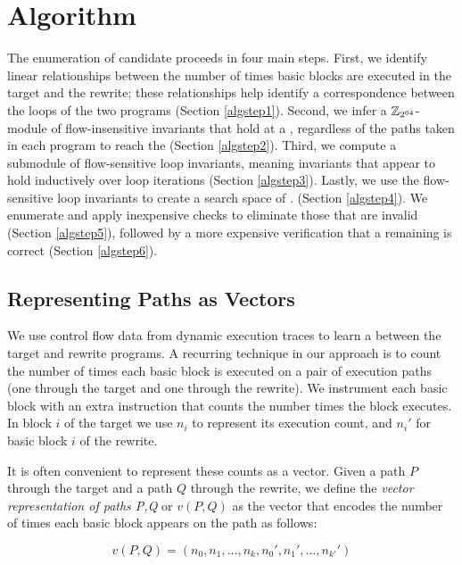 \section{Algorithm}\label{sec:algorithm}


The enumeration of candidate \bisimreps{} proceeds in four main steps.
First, we identify linear relationships between the number of times
basic blocks are executed in the target and the rewrite; these
relationships help identify a correspondence between the loops
of the two programs (Section \ref{algstep1}). Second, we infer
a $\mathbb{Z}_{2^{64}}$-module of flow-insensitive invariants that hold at a
\cutpoint, regardless of the paths taken in each program to reach the
\cutpoint{} (Section \ref{algstep2}). Third, we compute a submodule
of flow-sensitive loop invariants, meaning invariants that appear
to hold inductively over loop iterations (Section \ref{algstep3}).
Lastly, we use the flow-sensitive loop invariants to create a search
space of \bisimreps. (Section \ref{algstep4}). We enumerate \bisimreps and
apply inexpensive checks to eliminate those that are invalid (Section
\ref{algstep5}), followed by a more expensive verification that a
remaining \bisimrep{} is correct (Section \ref{algstep6}).

\subsection{Representing Paths as Vectors}

We use control flow data from dynamic execution traces to learn
a \bisim{} between the target and rewrite programs. A recurring
technique in our approach is to count the number of times each basic
block is executed on a pair of execution paths (one through the target
and one through the rewrite). We instrument each basic block with an
extra instruction that counts the number times the block executes.
In block $i$ of the target we use \shadow{} $n_i$ to represent its
execution count, and $n_i'$ for basic block $i$ of the rewrite.

It is often convenient to represent these counts as a vector. Given
a path $P$ through the target and a path $Q$ through the rewrite, we
define the \emph{vector representation of paths P,Q} or $v(P,Q)$ as
the vector that encodes the number of times each basic block appears
on the path as follows:

$$v(P,Q) = \left( n_0, n_1, \dotsc, n_k, n_0', n_1', \dotsc, n_{k'}' \right)$$

